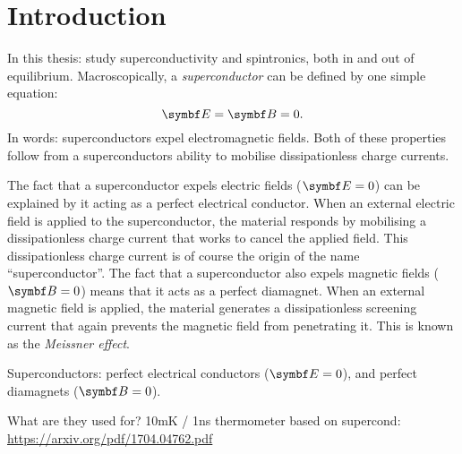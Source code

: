 \chapter{Introduction}\noindent
In this thesis: study superconductivity and spintronics, both in and out of equilibrium.
Macroscopically, a \emph{superconductor} can be defined by one simple equation: 
\begin{equation}
  \B{E} = \B{B} = 0.
\end{equation}
In words: superconductors expel electromagnetic fields.
Both of these properties follow from a superconductors ability to mobilise dissipationless charge currents.

The fact that a superconductor expels electric fields ($\B{E}=0$) can be explained by it acting as a perfect electrical conductor.
When an external electric field is applied to the superconductor, the material responds by mobilising a dissipationless charge current that works to cancel the applied field.
This dissipationless charge current is of course the origin of the name ``superconductor''.
The fact that a superconductor also expels magnetic fields ($\B{B}=0$) means that it acts as a perfect diamagnet.
When an external magnetic field is applied, the material generates a dissipationless screening current that again prevents the magnetic field from penetrating it.
This is known as the \emph{Meissner effect}.


Superconductors: perfect electrical conductors ($\B{E} = 0$), and perfect diamagnets ($\B{B} = 0$).

What are they used for?
10mK / 1ns thermometer based on supercond:
\url{https://arxiv.org/pdf/1704.04762.pdf}

\lipsum
